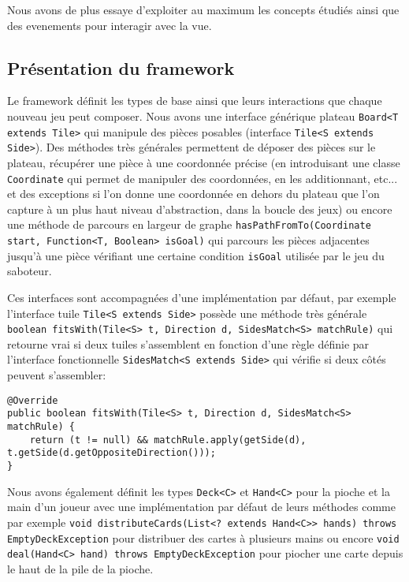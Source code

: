 \documentclass[a4paper, 11pt, DIV=9]{scrartcl}
\begin{document}
Nous avons de plus essaye d'exploiter au maximum les concepts étudiés ainsi que des evenements
pour interagir avec la vue.

\subsection{Présentation du framework}

Le framework définit les types de base ainsi que leurs interactions que chaque
nouveau jeu peut composer.
Nous avons une interface générique plateau \texttt{Board<T extends Tile>} qui
manipule des pièces posables (interface \texttt{Tile<S extends Side>}). Des
méthodes très générales permettent de déposer des pièces sur le plateau,
récupérer une pièce à une coordonnée précise (en introduisant une classe
\texttt{Coordinate} qui permet de manipuler des coordonnées, en les
additionnant, etc... et des exceptions si l'on donne une coordonnée en dehors du
plateau que l'on capture à un plus haut niveau d'abstraction, dans la boucle
des jeux) ou encore une méthode de parcours en largeur de graphe
\texttt{hasPathFromTo(Coordinate start, Function<T, Boolean> isGoal)} qui
parcours les pièces adjacentes jusqu'à une pièce vérifiant une certaine
condition \texttt{isGoal} utilisée par le jeu du saboteur.

Ces interfaces sont accompagnées d'une implémentation par défaut, par exemple
l'interface tuile \texttt{Tile<S extends Side>} possède une méthode très
générale \texttt{boolean fitsWith(Tile<S> t, Direction d, SidesMatch<S>
  matchRule)} qui retourne vrai si deux tuiles s'assemblent en fonction d'une
règle définie par l'interface fonctionnelle \texttt{SidesMatch<S extends Side>} qui vérifie si deux côtés
peuvent s'assembler:

\begin{verbatim}
@Override
public boolean fitsWith(Tile<S> t, Direction d, SidesMatch<S> matchRule) {
    return (t != null) && matchRule.apply(getSide(d), t.getSide(d.getOppositeDirection()));
}
\end{verbatim}

Nous avons également définit les types \texttt{Deck<C>} et \texttt{Hand<C>} pour
la pioche et la main d'un joueur avec une implémentation par défaut de leurs
méthodes comme par exemple \texttt{void distributeCards(List<? extends Hand<C>>
  hands) throws EmptyDeckException} pour distribuer des cartes à plusieurs mains
ou encore \texttt{void deal(Hand<C> hand) throws EmptyDeckException} pour
piocher une carte depuis le haut de la pile de la pioche.
\end{document}
